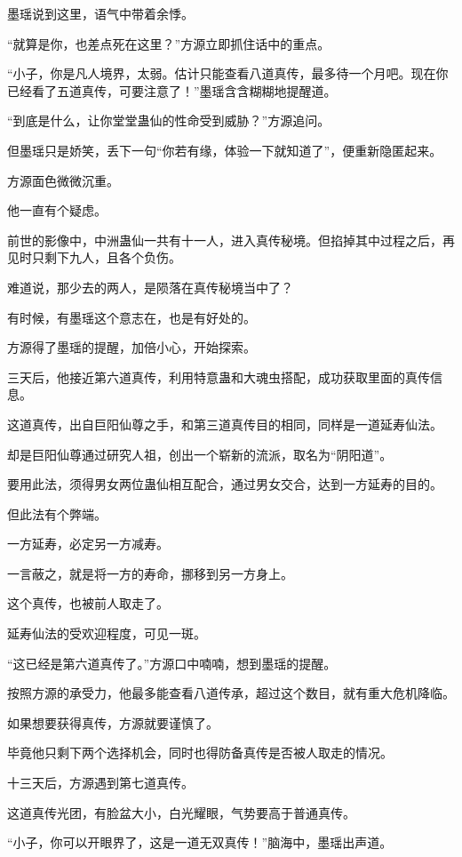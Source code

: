 \begin{this_body}
墨瑶说到这里，语气中带着余悸。

“就算是你，也差点死在这里？”方源立即抓住话中的重点。

“小子，你是凡人境界，太弱。估计只能查看八道真传，最多待一个月吧。现在你已经看了五道真传，可要注意了！”墨瑶含含糊糊地提醒道。

“到底是什么，让你堂堂蛊仙的性命受到威胁？”方源追问。

但墨瑶只是娇笑，丢下一句“你若有缘，体验一下就知道了”，便重新隐匿起来。

方源面色微微沉重。

他一直有个疑虑。

前世的影像中，中洲蛊仙一共有十一人，进入真传秘境。但掐掉其中过程之后，再见时只剩下九人，且各个负伤。

难道说，那少去的两人，是陨落在真传秘境当中了？

有时候，有墨瑶这个意志在，也是有好处的。

方源得了墨瑶的提醒，加倍小心，开始探索。

三天后，他接近第六道真传，利用特意蛊和大魂虫搭配，成功获取里面的真传信息。

这道真传，出自巨阳仙尊之手，和第三道真传目的相同，同样是一道延寿仙法。

却是巨阳仙尊通过研究人祖，创出一个崭新的流派，取名为“阴阳道”。

要用此法，须得男女两位蛊仙相互配合，通过男女交合，达到一方延寿的目的。

但此法有个弊端。

一方延寿，必定另一方减寿。

一言蔽之，就是将一方的寿命，挪移到另一方身上。

这个真传，也被前人取走了。

延寿仙法的受欢迎程度，可见一斑。

“这已经是第六道真传了。”方源口中喃喃，想到墨瑶的提醒。

按照方源的承受力，他最多能查看八道传承，超过这个数目，就有重大危机降临。

如果想要获得真传，方源就要谨慎了。

毕竟他只剩下两个选择机会，同时也得防备真传是否被人取走的情况。

十三天后，方源遇到第七道真传。

这道真传光团，有脸盆大小，白光耀眼，气势要高于普通真传。

“小子，你可以开眼界了，这是一道无双真传！”脑海中，墨瑶出声道。

\end{this_body}

